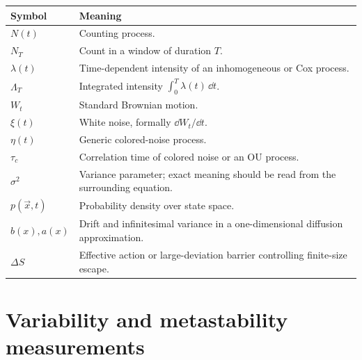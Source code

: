 \begin{tabularx}{\textwidth}{@{}p{}X@{}}
\toprule
\textbf{Symbol} & \textbf{Meaning} \\
\midrule
$N(t)$ & Counting process. \\
$N_T$ & Count in a window of duration $T$. \\
$\lambda(t)$ & Time-dependent intensity of an inhomogeneous or Cox process. \\
$\Lambda_T$ & Integrated intensity $\int_0^T\lambda(t)\,\dd t$. \\
$W_t$ & Standard Brownian motion. \\
$\xi(t)$ & White noise, formally $\dd W_t/\dd t$. \\
$\eta(t)$ & Generic colored-noise process. \\
$\tau_c$ & Correlation time of colored noise or an OU process. \\
$\sigma^2$ & Variance parameter; exact meaning should be read from the surrounding equation. \\
$p(\vec{x},t)$ & Probability density over state space. \\
$b(x),a(x)$ & Drift and infinitesimal variance in a one-dimensional diffusion approximation. \\
$\Delta S$ & Effective action or large-deviation barrier controlling finite-size escape. \\
\bottomrule
\end{tabularx}

\section{Variability and metastability measurements}
\label{app:notation-measurements}

